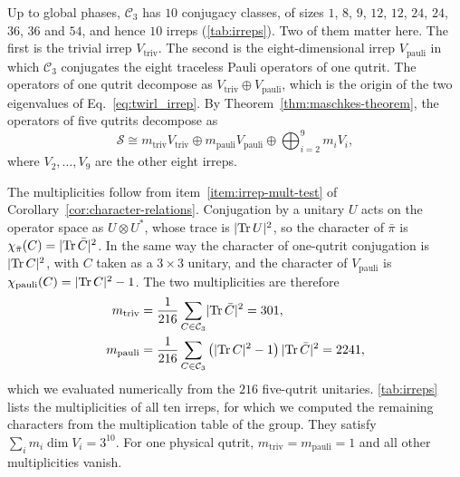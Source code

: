 Up to global phases, $\mathcal{C}_3$ has $10$ conjugacy classes, of sizes $1$, $8$, $9$, $12$, $12$, $24$, $24$, $36$, $36$ and $54$, and hence $10$ irreps (\autoref{tab:irreps}). Two of them matter here. The first is the trivial irrep $V_{\mathrm{triv}}$. The second is the eight-dimensional irrep $V_{\mathrm{pauli}}$ in which $\mathcal{C}_3$ conjugates the eight traceless Pauli operators of one qutrit. The operators of one qutrit decompose as $V_{\mathrm{triv}} \oplus V_{\mathrm{pauli}}$, which is the origin of the two eigenvalues of Eq.~\eqref{eq:twirl_irrep}. By Theorem~\ref{thm:maschkes-theorem}, the operators of five qutrits decompose as
\begin{equation}
    \mathcal{S} \cong m_{\mathrm{triv}} V_{\mathrm{triv}} \oplus m_{\mathrm{pauli}} V_{\mathrm{pauli}} \oplus \bigoplus_{i = 2}^{9} m_i V_i ,
    \label{eq:irrep-decomposition}
\end{equation}
where $V_2, \dots, V_9$ are the other eight irreps.

The multiplicities follow from item~\ref{item:irrep-mult-test} of Corollary~\ref{cor:character-relations}. Conjugation by a unitary $U$ acts on the operator space as $U \otimes U^{*}$, whose trace is $\lvert \operatorname{\mathrm{Tr}} U \rvert^2$, so the character of $\bar\pi$ is $\chi_{\bar\pi}(C) = \lvert \operatorname{\mathrm{Tr}} \bar C \rvert^2$. In the same way the character of one-qutrit conjugation is $\lvert \operatorname{\mathrm{Tr}} C \rvert^2$, with $C$ taken as a $3 \times 3$ unitary, and the character of $V_{\mathrm{pauli}}$ is $\chi_{\mathrm{pauli}}(C) = \lvert \operatorname{\mathrm{Tr}} C \rvert^2 - 1$. The two multiplicities are therefore
\begin{equation}
  \begin{aligned}
    m_{\mathrm{triv}} &= \frac{1}{216} \sum_{C \in \mathcal{C}_3} \lvert \operatorname{\mathrm{Tr}} \bar C \rvert^2 = 301 , \\
    m_{\mathrm{pauli}} &= \frac{1}{216} \sum_{C \in \mathcal{C}_3} \left( \lvert \operatorname{\mathrm{Tr}} C \rvert^2 - 1 \right) \lvert \operatorname{\mathrm{Tr}} \bar C \rvert^2 = 2241 ,
  \end{aligned}
  \label{eq:multiplicities}
\end{equation}
which we evaluated numerically from the $216$ five-qutrit unitaries. \autoref{tab:irreps} lists the multiplicities of all ten irreps, for which we computed the remaining characters from the multiplication table of the group. They satisfy $\sum_i m_i \dim V_i = 3^{10}$. For one physical qutrit, $m_{\mathrm{triv}} = m_{\mathrm{pauli}} = 1$ and all other multiplicities vanish.

